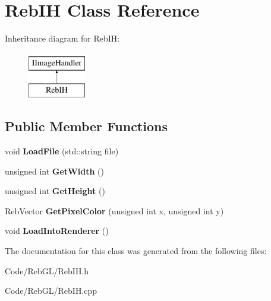 \hypertarget{class_reb_i_h}{}\section{Reb\+IH Class Reference}
\label{class_reb_i_h}
Inheritance diagram for Reb\+IH\+:\begin{figure}[H]
\begin{center}
\leavevmode
\includegraphics[height=2.000000cm]{class_reb_i_h}
\end{center}
\end{figure}
\subsection*{Public Member Functions}
\begin{DoxyCompactItemize}
\item 
void {\bfseries Load\+File} (std\+::string file)\hypertarget{class_reb_i_h_afeb31969ea86cebed4bc205ad60306d5}{}\label{class_reb_i_h_afeb31969ea86cebed4bc205ad60306d5}

\item 
unsigned int {\bfseries Get\+Width} ()\hypertarget{class_reb_i_h_ae0b3dfe24b35cacc4786e0252b0dac93}{}\label{class_reb_i_h_ae0b3dfe24b35cacc4786e0252b0dac93}

\item 
unsigned int {\bfseries Get\+Height} ()\hypertarget{class_reb_i_h_aa003b0d2b8c2cf0777a7e4a17344d68a}{}\label{class_reb_i_h_aa003b0d2b8c2cf0777a7e4a17344d68a}

\item 
Reb\+Vector {\bfseries Get\+Pixel\+Color} (unsigned int x, unsigned int y)\hypertarget{class_reb_i_h_a041e072fdae63ef358e6fcf685ef0c7c}{}\label{class_reb_i_h_a041e072fdae63ef358e6fcf685ef0c7c}

\item 
void {\bfseries Load\+Into\+Renderer} ()\hypertarget{class_reb_i_h_af0eda8eb569c9cf416c1b5b939135fa6}{}\label{class_reb_i_h_af0eda8eb569c9cf416c1b5b939135fa6}

\end{DoxyCompactItemize}


The documentation for this class was generated from the following files\+:\begin{DoxyCompactItemize}
\item 
Code/\+Reb\+G\+L/Reb\+I\+H.\+h\item 
Code/\+Reb\+G\+L/Reb\+I\+H.\+cpp\end{DoxyCompactItemize}
